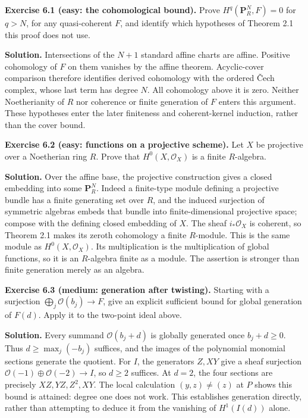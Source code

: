 \documentclass[11pt]{article}
\begin{document}
\textbf{Exercise 6.1 (easy: the cohomological bound).} Prove
\(H^q(\mathbf P_R^N,F)=0\) for \(q>N\), for any quasi-coherent \(F\),
and identify which hypotheses of Theorem 2.1 this proof does not use.

\textbf{Solution.} Intersections of the \(N+1\) standard affine charts
are affine. Positive cohomology of \(F\) on them vanishes by the affine
theorem. Acyclic-cover comparison therefore identifies derived
cohomology with the ordered Čech complex, whose last term has degree
\(N\). All cohomology above it is zero. Neither Noetherianity of \(R\)
nor coherence or finite generation of \(F\) enters this argument. These
hypotheses enter the later finiteness and coherent-kernel induction,
rather than the cover bound.

\textbf{Exercise 6.2 (easy: functions on a projective scheme).} Let
\(X\) be projective over a Noetherian ring \(R\). Prove that
\(H^0(X,\mathcal O_X)\) is a finite \(R\)-algebra.

\textbf{Solution.} Over the affine base, the projective construction
gives a closed embedding into some \(\mathbf P_R^N\). Indeed a
finite-type module defining a projective bundle has a finite generating
set over \(R\), and the induced surjection of symmetric algebras embeds
that bundle into finite-dimensional projective space; compose with the
defining closed embedding of \(X\). The sheaf \(i_*\mathcal O_X\) is
coherent, so Theorem 2.1 makes its zeroth cohomology a finite
\(R\)-module. This is the same module as \(H^0(X,\mathcal O_X)\). Its
multiplication is the multiplication of global functions, so it is an
\(R\)-algebra finite as a module. The assertion is stronger than finite
generation merely as an algebra.

\textbf{Exercise 6.3 (medium: generation after twisting).} Starting with
a surjection \(\bigoplus_j\mathcal O(b_j)\to F\), give an explicit
sufficient bound for global generation of \(F(d)\). Apply it to the
two-point ideal above.

\textbf{Solution.} Every summand \(\mathcal O(b_j+d)\) is globally
generated once \(b_j+d\ge0\). Thus \(d\ge\max_j(-b_j)\) suffices, and
the images of the polynomial monomial sections generate the quotient.
For \(I\), the generators \(Z,XY\) give a sheaf surjection
\(\mathcal O(-1)\oplus\mathcal O(-2)\to I\), so \(d\ge2\) suffices. At
\(d=2\), the four sections are precisely \(XZ,YZ,Z^2,XY\). The local
calculation \((y,z)\ne(z)\) at \(P\) shows this bound is attained:
degree one does not work. This establishes generation directly, rather
than attempting to deduce it from the vanishing of \(H^1(I(d))\) alone.
\end{document}
